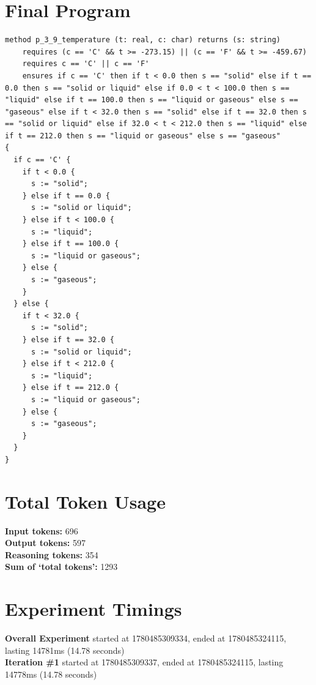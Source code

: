 \documentclass{article}
\begin{document}
\section*{Final Program}
\begin{lstlisting}
method p_3_9_temperature (t: real, c: char) returns (s: string)
	requires (c == 'C' && t >= -273.15) || (c == 'F' && t >= -459.67)
	requires c == 'C' || c == 'F'
	ensures if c == 'C' then if t < 0.0 then s == "solid" else if t == 0.0 then s == "solid or liquid" else if 0.0 < t < 100.0 then s == "liquid" else if t == 100.0 then s == "liquid or gaseous" else s == "gaseous" else if t < 32.0 then s == "solid" else if t == 32.0 then s == "solid or liquid" else if 32.0 < t < 212.0 then s == "liquid" else if t == 212.0 then s == "liquid or gaseous" else s == "gaseous"
{
  if c == 'C' {
    if t < 0.0 {
      s := "solid";
    } else if t == 0.0 {
      s := "solid or liquid";
    } else if t < 100.0 {
      s := "liquid";
    } else if t == 100.0 {
      s := "liquid or gaseous";
    } else {
      s := "gaseous";
    }
  } else {
    if t < 32.0 {
      s := "solid";
    } else if t == 32.0 {
      s := "solid or liquid";
    } else if t < 212.0 {
      s := "liquid";
    } else if t == 212.0 {
      s := "liquid or gaseous";
    } else {
      s := "gaseous";
    }
  }
}
\end{lstlisting}
\section*{Total Token Usage}
\textbf{Input tokens: }696
\\\textbf{Output tokens: }597
\\\textbf{Reasoning tokens: }354
\\\textbf{Sum of `total tokens': }1293
\section*{Experiment Timings}
\textbf{Overall Experiment} started at 1780485309334, ended at 1780485324115, lasting 14781ms (14.78 seconds)
\\\textbf{Iteration \#1} started at 1780485309337, ended at 1780485324115, lasting 14778ms (14.78 seconds)
\end{document}
